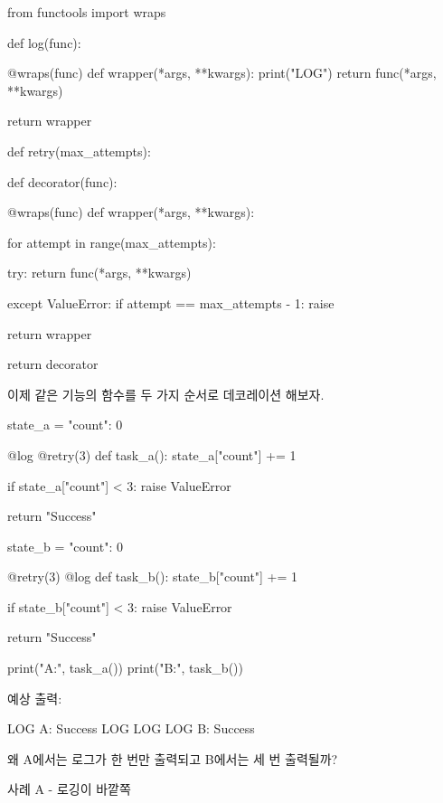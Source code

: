 \begin{dhkcode}
from functools import wraps

def log(func):

    @wraps(func)
    def wrapper(*args, **kwargs):
        print("LOG")
        return func(*args, **kwargs)

    return wrapper


def retry(max_attempts):

    def decorator(func):

        @wraps(func)
        def wrapper(*args, **kwargs):

            for attempt in range(max_attempts):

                try:
                    return func(*args, **kwargs)

                except ValueError:
                    if attempt == max_attempts - 1:
                        raise

        return wrapper

    return decorator
\end{dhkcode}

이제 같은 기능의 함수를 두 가지 순서로 데코레이션 해보자.

\begin{dhkcode}
state_a = {"count": 0}


@log
@retry(3)
def task_a():
    state_a["count"] += 1

    if state_a["count"] < 3:
        raise ValueError

    return "Success"


state_b = {"count": 0}


@retry(3)
@log
def task_b():
    state_b["count"] += 1

    if state_b["count"] < 3:
        raise ValueError

    return "Success"


print("A:", task_a())
print("B:", task_b())
\end{dhkcode}

예상 출력:

\begin{dhkzsh}
LOG
A: Success
LOG
LOG
LOG
B: Success
\end{dhkzsh}

왜 A에서는 로그가 한 번만 출력되고 B에서는 세 번 출력될까?

\begin{dhknote}
\begin{dhksmry}[centered]
사례 A - 로깅이 바깥쪽
\end{dhksmry}
\end{dhknote}

